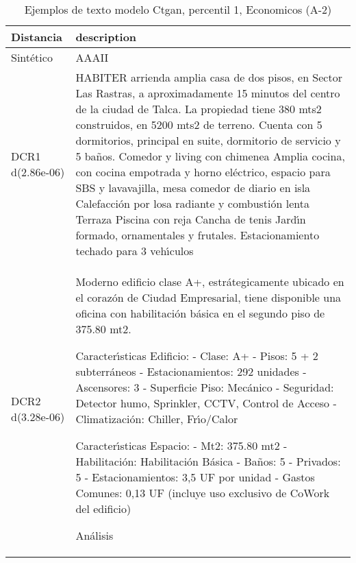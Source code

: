 \begin{table}[H]
\centering
\fontsize{10}{14}\selectfont
\caption{Ejemplos de texto modelo Ctgan, percentil 1, Economicos (A-2)}
\label{table-example-economicos-a-2-ctgan-1p-text}
\begin{tabular}{|l|m{35em}|}
\hline
\rowcolor[gray]{0.8}
Distancia & description \\
\hline Sintético & AAAII \\
\hline DCR1 d(2.86e-06) & HABITER arrienda amplia casa de dos pisos, en Sector Las Rastras, a aproximadamente 15 minutos del centro de la ciudad de Talca.  La propiedad tiene 380 mts2 construidos, en 5200 mts2 de terreno. Cuenta con 5 dormitorios, principal en suite, dormitorio de servicio y 5 ba\~nos.   Comedor y living con chimenea Amplia cocina, con cocina empotrada y horno el\'ectrico, espacio para SBS y lavavajilla, mesa comedor de diario en isla Calefacci\'on por losa radiante y combusti\'on lenta Terraza Piscina con reja Cancha de tenis Jard{\'\i}n formado, ornamentales y frutales.  Estacionamiento techado para 3 veh{\'\i}culos \\
\hline DCR2 d(3.28e-06) & Moderno edificio clase A+, estr\'ategicamente ubicado en el coraz\'on de Ciudad Empresarial, tiene disponible una oficina con habilitaci\'on b\'asica en el segundo piso de 375.80 mt2.

Caracter{\'\i}sticas Edificio:
-	Clase: A+
-	Pisos: 5 + 2 subterr\'aneos
-	Estacionamientos: 292 unidades
-	Ascensores: 3
-	Superficie Piso: Mec\'anico
-	Seguridad: Detector humo, Sprinkler, CCTV, Control de Acceso
-	Climatizaci\'on: Chiller, Fr{\'\i}o/Calor

Caracter{\'\i}sticas Espacio:
-	Mt2: 375.80 mt2
-	Habilitaci\'on: Habilitaci\'on B\'asica
-	Ba\~nos: 5
-	Privados: 5
-	Estacionamientos: 3,5 UF por unidad
-	Gastos Comunes: 0,13 UF (incluye uso exclusivo de CoWork del edificio)

An\'alisis \\
\hline
\end{tabular}
\end{table}
